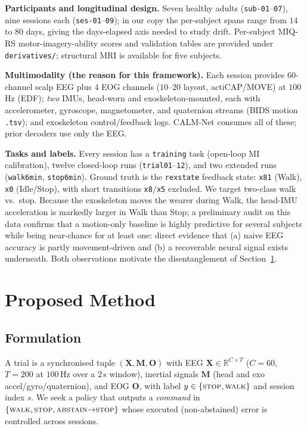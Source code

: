 \documentclass[journal]{IEEEtran}
\begin{document}
\textbf{Participants and longitudinal design.} Seven healthy adults
(\texttt{sub-01}--\texttt{07}), nine sessions each (\texttt{ses-01}--\texttt{09}); in
our copy the per-subject spans range from $14$ to $80$ days, giving the days-elapsed
axis needed to study drift. Per-subject MIQ-RS motor-imagery-ability scores and
validation tables are provided under \texttt{derivatives/}; structural MRI is
available for five subjects.

\textbf{Multimodality (the reason for this framework).} Each session provides
$60$-channel scalp EEG plus $4$ EOG channels ($10$--$20$ layout, actiCAP/MOVE) at
$100$\,Hz (EDF); \emph{two} IMUs, head-worn and exoskeleton-mounted, each with
accelerometer, gyroscope, magnetometer, and quaternion streams (BIDS motion
\texttt{.tsv}); and exoskeleton control/feedback logs. CALM-Net consumes all of
these; prior decoders use only the EEG.

\textbf{Tasks and labels.} Every session has a \texttt{training} task (open-loop MI
calibration), twelve closed-loop runs (\texttt{trial01}--\texttt{12}), and two
extended runs (\texttt{walk6min}, \texttt{stop6min}). Ground truth is the
\texttt{rexstate} feedback state: \texttt{x81} (Walk), \texttt{x0} (Idle/Stop), with
short transitions \texttt{x8}/\texttt{x5} excluded. We target two-class walk vs.\
stop. Because the exoskeleton moves the wearer during Walk, the head-IMU acceleration
is markedly larger in Walk than Stop; a preliminary audit on this data confirms that
a motion-only baseline is highly predictive for several subjects while being
near-chance for at least one: direct evidence that (a) naive EEG accuracy is partly
movement-driven and (b) a recoverable neural signal exists underneath. Both
observations motivate the disentanglement of Section~\ref{sec:method}.

\section{Proposed Method}\label{sec:method}
\subsection{Formulation}
A trial is a synchronised tuple $(\mathbf{X},\mathbf{M},\mathbf{O})$ with EEG
$\mathbf{X}\in\mathbb{R}^{C\times T}$ ($C{=}60$, $T{=}200$ at $100$\,Hz over a $2$\,s
window), inertial signals $\mathbf{M}$ (head and exo accel/gyro/quaternion), and EOG
$\mathbf{O}$, with label $y\in\{\textsc{stop},\textsc{walk}\}$ and session index
$s$. We seek a policy that outputs a \emph{command} in
$\{\textsc{walk},\textsc{stop},\textsc{abstain}{\to}\textsc{stop}\}$ whose executed
(non-abstained) error is controlled across sessions.
\end{document}
